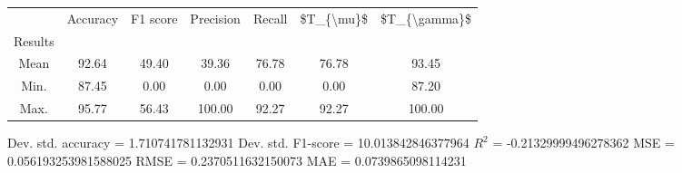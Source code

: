 \begin{tabular}{|c|c|c|c|c|c|c|}
\toprule
{} &  Accuracy &  F1 score &  Precision &  Recall &  \$T\_\{\textbackslash mu\}\$ &  \$T\_\{\textbackslash gamma\}\$ \\
Results &           &           &            &         &            &               \\
\hline
Mean    &     92.64 &     49.40 &      39.36 &   76.78 &      76.78 &         93.45 \\
Min.    &     87.45 &      0.00 &       0.00 &    0.00 &       0.00 &         87.20 \\
Max.    &     95.77 &     56.43 &     100.00 &   92.27 &      92.27 &        100.00 \\
\bottomrule
\end{tabular}

 Dev. std. accuracy = 1.710741781132931
 Dev. std. F1-score = 10.013842846377964
 $R^2$ = -0.21329999496278362
 MSE = 0.056193253981588025
 RMSE = 0.2370511632150073
 MAE = 0.0739865098114231